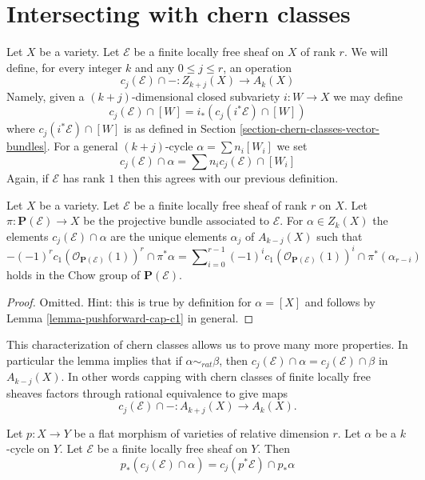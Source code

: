 \section{Intersecting with chern classes}
\label{section-intersecting-chern-classes}

\noindent
Let $X$ be a variety. Let $\mathcal{E}$ be a finite locally free sheaf on $X$
of rank $r$. We will define, for every integer $k$ and any
$0 \leq j \leq r$, an operation
$$
c_j(\mathcal{E}) \cap - :
Z_{k + j}(X) \to A_k(X)
$$
Namely, given a $(k + j)$-dimensional closed subvariety
$i : W \to X$ we may define
$$
c_j(\mathcal{E}) \cap [W] = i_*(c_j({i^*\mathcal{E}}) \cap [W])
$$
where $c_j({i^*\mathcal{E}}) \cap [W]$ is as defined in
Section \ref{section-chern-classes-vector-bundles}.
For a general $(k + j)$-cycle $\alpha = \sum n_i [W_i]$ we set
$$
c_j(\mathcal{E}) \cap \alpha = \sum n_i c_j(\mathcal{E}) \cap [W_i]
$$
Again, if $\mathcal{E}$ has rank $1$ then this agrees with our
previous definition.

\begin{lemma}
\label{lemma-determine-intersections}
Let $X$ be a variety.
Let $\mathcal{E}$ be a finite locally free sheaf of rank $r$ on $X$.
Let $\pi : \mathbf{P}(\mathcal{E}) \to X$ be the projective bundle
associated to $\mathcal{E}$.
For $\alpha \in Z_k(X)$ the elements
$c_j(\mathcal{E}) \cap \alpha$ are the unique elements
$\alpha_j$ of $A_{k - j}(X)$
such that
$$
-(-1)^r c_1(\mathcal{O}_{\mathbf{P}(\mathcal{E})}(1))^r \cap \pi^*\alpha
=
\sum\nolimits_{i = 0}^{r - 1}
(-1)^i c_1(\mathcal{O}_{\mathbf{P}(\mathcal{E})}(1))^i \cap
\pi^*(\alpha_{r - i})
$$
holds in the Chow group of $\mathbf{P}(\mathcal{E})$.
\end{lemma}

\begin{proof}
Omitted. Hint: this is true by definition for
$\alpha = [X]$ and follows by Lemma \ref{lemma-pushforward-cap-c1}
in general.
\end{proof}

\noindent
This characterization of chern classes allows us to prove many more
properties. In particular the lemma implies that
if $\alpha \sim_{rat} \beta$, then
$c_j(\mathcal{E}) \cap \alpha = c_j(\mathcal{E}) \cap \beta$
in $A_{k - j}(X)$. In other words capping with chern classes of
finite locally free sheaves factors through rational equivalence
to give maps
$$
c_j(\mathcal{E}) \cap - :
A_{k + j}(X) \to A_k(X).
$$

\begin{lemma}
\label{lemma-flat-pushback-cap-cj}
Let $p : X \to Y$ be a flat morphism of varieties of relative dimension $r$.
Let $\alpha$ be a $k$-cycle on $Y$.
Let $\mathcal{E}$ be a finite locally free sheaf on $Y$.
Then
$$
p_*(c_j(\mathcal{E}) \cap \alpha) = c_j(p^*\mathcal{E}) \cap p_*\alpha
$$
\end{lemma}

